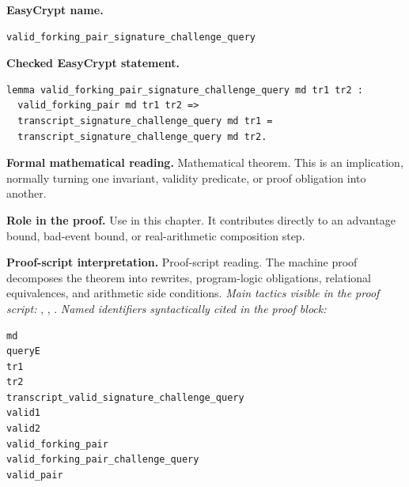 \begin{formaltheorem}
\noindent\textbf{EasyCrypt name.}
\begin{lstlisting}[language=EasyCrypt,basicstyle=\ttfamily\scriptsize]
valid_forking_pair_signature_challenge_query
\end{lstlisting}
\noindent\textbf{Checked EasyCrypt statement.}
\begin{lstlisting}[language=EasyCrypt,basicstyle=\ttfamily\scriptsize]
lemma valid_forking_pair_signature_challenge_query md tr1 tr2 :
  valid_forking_pair md tr1 tr2 =>
  transcript_signature_challenge_query md tr1 =
  transcript_signature_challenge_query md tr2.
\end{lstlisting}
\noindent\textbf{Formal mathematical reading.}
Mathematical theorem. This is an implication, normally turning one invariant, validity predicate, or proof obligation into another.

\noindent\textbf{Role in the proof.}
Use in this chapter. It contributes directly to an advantage bound, bad-event bound, or real-arithmetic composition step.

\noindent\textbf{Proof-script interpretation.}
Proof-script reading. The machine proof decomposes the theorem into rewrites, program-logic obligations, relational equivalences, and arithmetic side conditions.
\emph{Main tactics visible in the proof script:} , , .
\emph{Named identifiers syntactically cited in the proof block:}
\begin{lstlisting}[language=EasyCrypt,basicstyle=\ttfamily\scriptsize]
md
queryE
tr1
tr2
transcript_valid_signature_challenge_query
valid1
valid2
valid_forking_pair
valid_forking_pair_challenge_query
valid_pair
\end{lstlisting}

\end{formaltheorem}


